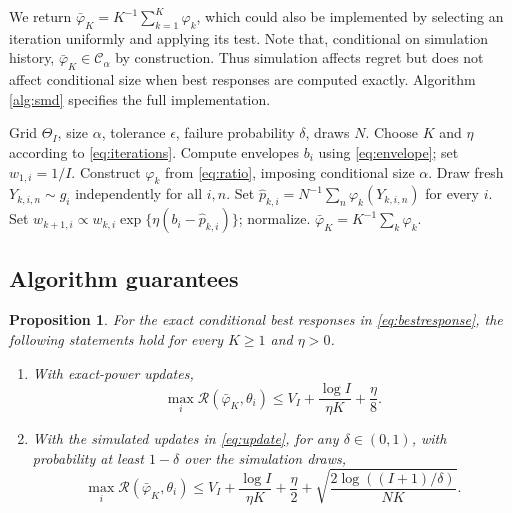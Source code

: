 \documentclass[11pt]{article}
\newtheorem{proposition}{Proposition}
\newcommand{\CS}{\mathcal{C}_{\alpha}}
\newcommand{\Reg}{\mathcal{R}}
\begin{document}
We return $\bar\varphi_K=K^{-1}\sum_{k=1}^K\varphi_k$, which could also be implemented by selecting an iteration uniformly and applying its test. Note that, conditional on simulation history, $\bar\varphi_K\in\CS$ by construction. Thus simulation affects regret but does not affect conditional size when best responses are computed exactly. Algorithm \ref{alg:smd} specifies the full implementation.

\begin{algorithm}[t]
\caption{Conditionally similar testing by SMD}\label{alg:smd}
\begin{algorithmic}[1]
\Require Grid $\Theta_I$, size $\alpha$, tolerance $\epsilon$, failure probability $\delta$, draws $N$.
\State Choose $K$ and $\eta$ according to \eqref{eq:iterations}.
\State Compute envelopes $b_i$ using \eqref{eq:envelope}; set $w_{1,i}=1/I$.
\State Construct $\varphi_k$ from \eqref{eq:ratio}, imposing conditional size $\alpha$.
\State Draw fresh $Y_{k,i,n}\sim g_i$ independently for all $i,n$.
\State Set $\widehat p_{k,i}=N^{-1}\sum_n\varphi_k(Y_{k,i,n})$ for every $i$.
\State Set $w_{k+1,i}\propto w_{k,i}\exp\{\eta(b_i-\widehat p_{k,i})\}$; normalize.
\EndFor
\State \Return $\bar\varphi_K=K^{-1}\sum_k\varphi_k$.
\end{algorithmic}
\end{algorithm}

\subsection{Algorithm guarantees}

\begin{proposition}\label{prop:bounds}
For the exact conditional best responses in \eqref{eq:bestresponse}, the following statements hold for every $K\ge1$ and $\eta>0$.
\begin{enumerate}
\item With exact-power updates,
\begin{equation}\label{eq:deterministic} \max_i\Reg(\bar\varphi_K,\theta_i)\le V_I+\frac{\log I}{\eta K}+\frac{\eta}{8}. \end{equation}
\item With the simulated updates in \eqref{eq:update}, for any $\delta\in(0,1)$, with probability at least $1-\delta$ over the simulation draws,
\begin{equation}\label{eq:stochastic} \max_i\Reg(\bar\varphi_K,\theta_i)\le V_I+\frac{\log I}{\eta K}+\frac{\eta}{2}+\sqrt{\frac{2\log((I+1)/\delta)}{NK}}. \end{equation}
\end{enumerate}
\end{proposition}
\end{document}
